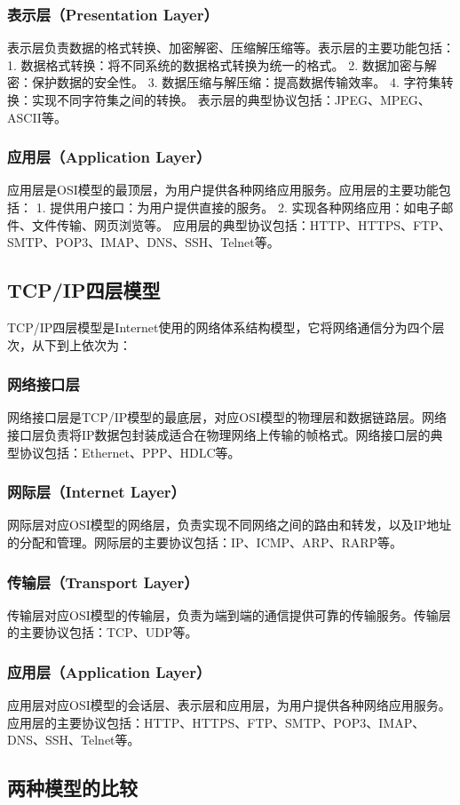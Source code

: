 \documentclass{book}
\begin{document}
\subsubsection{表示层（Presentation Layer）}
表示层负责数据的格式转换、加密解密、压缩解压缩等。表示层的主要功能包括：
1. 数据格式转换：将不同系统的数据格式转换为统一的格式。
2. 数据加密与解密：保护数据的安全性。
3. 数据压缩与解压缩：提高数据传输效率。
4. 字符集转换：实现不同字符集之间的转换。
表示层的典型协议包括：JPEG、MPEG、ASCII等。
\subsubsection{应用层（Application Layer）}
应用层是OSI模型的最顶层，为用户提供各种网络应用服务。应用层的主要功能包括：
1. 提供用户接口：为用户提供直接的服务。
2. 实现各种网络应用：如电子邮件、文件传输、网页浏览等。
应用层的典型协议包括：HTTP、HTTPS、FTP、SMTP、POP3、IMAP、DNS、SSH、Telnet等。
\subsection{TCP/IP四层模型}
TCP/IP四层模型是Internet使用的网络体系结构模型，它将网络通信分为四个层次，从下到上依次为：
\subsubsection{网络接口层}
网络接口层是TCP/IP模型的最底层，对应OSI模型的物理层和数据链路层。网络接口层负责将IP数据包封装成适合在物理网络上传输的帧格式。网络接口层的典型协议包括：Ethernet、PPP、HDLC等。
\subsubsection{网际层（Internet Layer）}
网际层对应OSI模型的网络层，负责实现不同网络之间的路由和转发，以及IP地址的分配和管理。网际层的主要协议包括：IP、ICMP、ARP、RARP等。
\subsubsection{传输层（Transport Layer）}
传输层对应OSI模型的传输层，负责为端到端的通信提供可靠的传输服务。传输层的主要协议包括：TCP、UDP等。
\subsubsection{应用层（Application Layer）}
应用层对应OSI模型的会话层、表示层和应用层，为用户提供各种网络应用服务。应用层的主要协议包括：HTTP、HTTPS、FTP、SMTP、POP3、IMAP、DNS、SSH、Telnet等。
\subsection{两种模型的比较}
\end{document}
